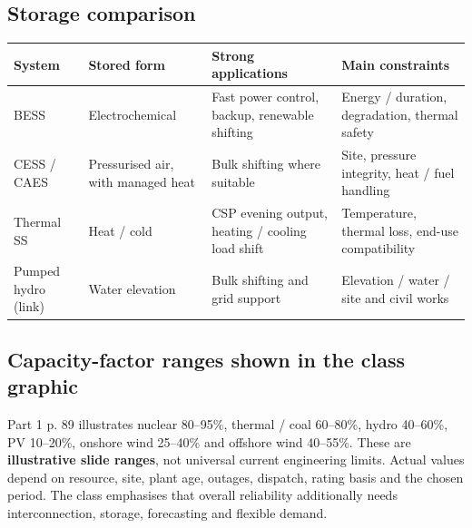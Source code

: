\documentclass[11pt,a4paper]{article}
\begin{document}
\subsection{Storage comparison}\label{storagecomparison}
\begin{center}\small
\begin{tabularx}{\textwidth}{L{2.3cm}YYY}
\toprule\textbf{System} & \textbf{Stored form} & \textbf{Strong applications} & \textbf{Main constraints}\\\midrule
BESS & Electrochemical & Fast power control, backup, renewable shifting & Energy / duration, degradation, thermal safety\\
CESS / CAES & Pressurised air, with managed heat & Bulk shifting where suitable & Site, pressure integrity, heat / fuel handling\\
Thermal SS & Heat / cold & CSP evening output, heating / cooling load shift & Temperature, thermal loss, end-use compatibility\\
Pumped hydro (link) & Water elevation & Bulk shifting and grid support & Elevation / water / site and civil works\\\bottomrule
\end{tabularx}\end{center}

\subsection{Capacity-factor ranges shown in the class graphic}
Part 1 p. 89 illustrates nuclear 80--95\%, thermal / coal 60--80\%, hydro 40--60\%, PV 10--20\%, onshore wind 25--40\% and offshore wind 40--55\%. These are \textbf{illustrative slide ranges}, not universal current engineering limits. Actual values depend on resource, site, plant age, outages, dispatch, rating basis and the chosen period. The class emphasises that overall reliability additionally needs interconnection, storage, forecasting and flexible demand.
\end{document}
